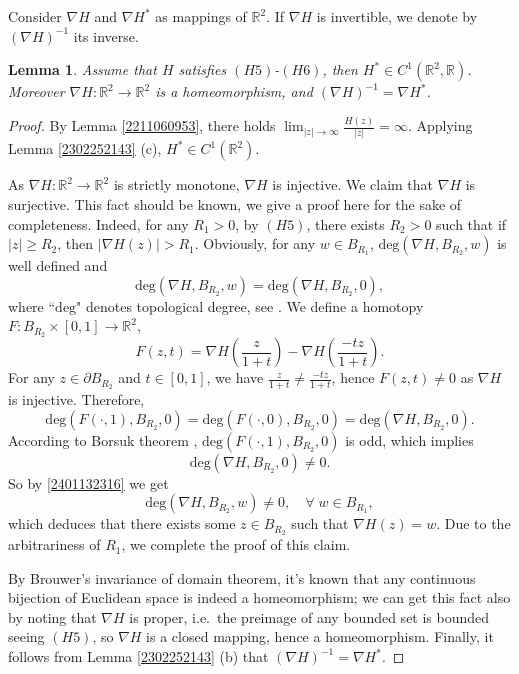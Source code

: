 \documentclass[10pt]{article}
\numberwithin{equation}{section}
\newtheorem{lemma}[theorem]{Lemma}
\newcommand{\R}{\mathbb R}
\numberwithin{equation}{section}
\begin{document}
Consider $\nabla H$ and  $\nabla H^*$ as mappings of $\R^2$. If $\nabla H$ is invertible, we denote by $(\nabla H)^{-1}$ its inverse.

\begin{lemma}\label{22112307}
Assume that $H$ satisfies $(H5)$-$(H6)$, then $H^*\in C^1(\mathbb{R}^2, \mathbb{R})$. Moreover $\nabla H : \mathbb{R}^2\to \mathbb{R}^2$ is a homeomorphism, and $(\nabla H)^{-1} = \nabla H^*$.
\end{lemma}
\begin{proof}
By Lemma \ref{2211060953}, there holds $\lim_{|z|\to \infty}{\frac{H(z)}{|z|}}=\infty$. Applying Lemma \ref{2302252143} (c), $H^*\in C^1(\mathbb{R}^2)$. 

As $\nabla H: \mathbb{R}^2\to \mathbb{R}^2$ is strictly monotone, $\nabla H$ is injective. We claim that $\nabla H$ is surjective. This fact should be known, we give a proof here for the sake of completeness. Indeed, for any $R_1>0$, by $(H5)$, there exists $R_2>0$ such that if $|z|\ge R_2$, then $|\nabla H(z)|>R_1$. Obviously, for any $w \in B_{R_1}$, $\text{deg} (\nabla H, B_{R_2}, w)$ is well defined and
\begin{equation}\label{2401132316}
\text{deg} (\nabla H, B_{R_2}, w)=\text{deg} (\nabla H, B_{R_2}, 0),
\end{equation}
where ``$\text{deg}$" denotes topological degree, see \cite[Appendix]{Willem96}.
We define a homotopy $F: B_{R_2}\times [0,1]\to \mathbb{R}^2$,
\begin{equation}\label{2211051915}
F(z, t)=\nabla H\left(\frac{z}{1+t}\right)-\nabla H\left(\frac{-tz}{1+t}\right).
\end{equation}
For any $z\in \partial B_{R_2}$ and $t\in [0, 1]$, we have $\frac{z}{1+t}\neq \frac{-tz}{1+t}$, hence $F(z, t)\neq 0$ as $\nabla H$ is injective. Therefore,
\[
\text{deg} (F(\cdot, 1), B_{R_2}, 0)=\text{deg} (F(\cdot, 0), B_{R_2}, 0)=\text{deg} (\nabla H, B_{R_2}, 0).
\]
According to Borsuk theorem \cite[Theorem D.17]{Willem96}, $\text{deg} (F(\cdot, 1), B_{R_2}, 0)$ is odd, which implies
$$\text{deg} (\nabla H, B_{R_2}, 0)\neq 0.$$
So by \eqref{2401132316} we get
$$\text{deg} (\nabla H, B_{R_2}, w)\neq 0,\quad \forall \; w\in B_{R_1},$$
which deduces that there exists some $z\in B_{R_2}$ such that $\nabla H(z)=w$. Due to the arbitrariness of $R_1$, we complete the proof of this claim.

By Brouwer's invariance of domain theorem, it's known that any continuous bijection of Euclidean space is indeed a homeomorphism; we can get this fact also by noting that $\nabla H$ is proper, i.e.~the preimage of any bounded set is bounded seeing $(H5)$, so $\nabla H$ is a closed mapping, hence a homeomorphism. Finally, it follows from Lemma \ref{2302252143} (b) that $(\nabla H)^{-1}=\nabla H^*$.
\end{proof}
\end{document}
